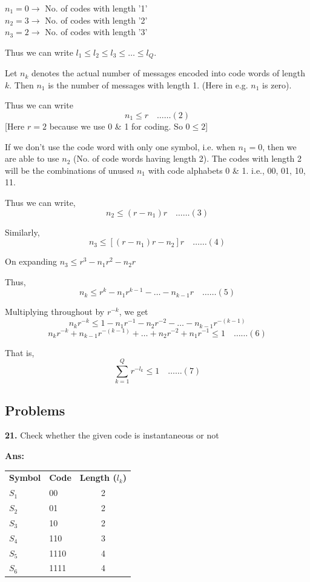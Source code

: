 \documentclass[12pt]{article}
\begin{document}
$n_1 = 0 \rightarrow$ No. of codes with length '1' \\
$n_2 = 3 \rightarrow$ No. of codes with length '2' \\
$n_3 = 2 \rightarrow$ No. of codes with length '3'

Thus we can write $l_1 \le l_2 \le l_3 \le \ldots \le l_Q$.

Let $n_k$ denotes the actual number of messages encoded into code words of length $k$. Then $n_1$ is the number of messages with length 1. (Here in e.g. $n_1$ is zero).

Thus we can write
$$n_1 \le r \quad \ldots\ldots(2)$$
[Here $r=2$ because we use 0 \& 1 for coding. So $0 \le 2$]

If we don't use the code word with only one symbol, i.e. when $n_1=0$, then we are able to use $n_2$ (No. of code words having length 2). The codes with length 2 will be the combinations of unused $n_1$ with code alphabets 0 \& 1. i.e., 00, 01, 10, 11.

Thus we can write,
$$n_2 \le (r - n_1)r \quad \ldots\ldots(3)$$

Similarly,
$$n_3 \le [(r - n_1)r - n_2]r \quad \ldots\ldots(4)$$

On expanding $n_3 \le r^3 - n_1 r^2 - n_2 r$

Thus,
$$n_k \le r^k - n_1 r^{k-1} - \ldots - n_{k-1} r \quad \ldots\ldots(5)$$

Multiplying throughout by $r^{-k}$, we get
$$n_k r^{-k} \le 1 - n_1 r^{-1} - n_2 r^{-2} - \ldots - n_{k-1} r^{-(k-1)}$$
$$n_k r^{-k} + n_{k-1} r^{-(k-1)} + \ldots + n_2 r^{-2} + n_1 r^{-1} \le 1 \quad \ldots\ldots(6)$$

That is,
$$\sum_{k=1}^{Q} r^{-l_k} \le 1 \quad \ldots\ldots(7)$$


\subsection{Problems}

\textbf{21.} Check whether the given code is instantaneous or not

\textbf{Ans:}
\begin{table}[ht]
	\centering
	\renewcommand{\arraystretch}{1.2}
	\begin{tabular}{l l c}
		\rowcolor{black!10}
		\textbf{Symbol} & \textbf{Code} & \textbf{Length ($l_k$)} \\
		$S_1$           & 00            & 2                       \\
		$S_2$           & 01            & 2                       \\
		$S_3$           & 10            & 2                       \\
		$S_4$           & 110           & 3                       \\
		$S_5$           & 1110          & 4                       \\
		$S_6$           & 1111          & 4                       \\
	\end{tabular}
\end{table}
\end{document}
